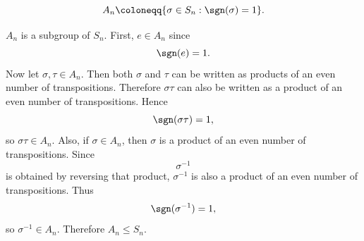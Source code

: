 \begin{definition}
    \[
        A_n \coloneqq \{\sigma\in S_n : \sgn(\sigma)=1\}.
    \]
\end{definition}

\begin{theorem}{
    $A_n$ is a subgroup of $S_n$.
}
    First, $e\in A_n$ since
    \[
        \sgn(e)=1.
    \]
    Now let $\sigma,\tau\in A_n$.
    Then both $\sigma$ and $\tau$ can be written as products of an even number of transpositions.
    Therefore $\sigma\tau$ can also be written as a product of an even number of transpositions.
    Hence
    \[
        \sgn(\sigma\tau)=1,
    \]
    so $\sigma\tau\in A_n$.
    Also, if $\sigma\in A_n$, then $\sigma$ is a product of an even number of transpositions.
    Since
    \[
        \sigma^{-1}
    \]
    is obtained by reversing that product, $\sigma^{-1}$ is also a product of an even number of transpositions.
    Thus
    \[
        \sgn(\sigma^{-1})=1,
    \]
    so $\sigma^{-1}\in A_n$.
    Therefore $A_n\leq S_n$.
\end{theorem}